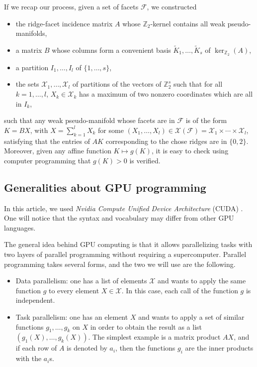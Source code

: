 \documentclass[11pt]{amsart}
\theoremstyle{plain}
\numberwithin{equation}{section}
\theoremstyle{definition}
\newcommand{\cF}{\mathcal{F}}
\newcommand{\cX}{\mathcal{X}}
\newcommand{\Z}{\mathbb{Z}}
\begin{document}
If we recap our process, given a set of facets $\cF$, we constructed
\begin{itemize}
	\item the ridge-facet incidence matrix $A$ whose $\Z_2$-kernel contains all weak pseudo-manifolds,
	\item a matrix $B$ whose columns form a convenient basis $\widetilde{K}_1,\ldots,\widetilde{K}_s$ of $\ker_{\Z_2}(A)$,
	\item a partition $I_1,\ldots,I_l$ of $\{1,\ldots,s\}$,
	\item the sets $\cX_1,\ldots,\cX_l$ of partitions of the vectors of $\Z_2^s$ such that for all $k=1,\ldots,l$, $X_k\in\cX_k$ has a maximum of two nonzero coordinates which are all in $I_k$,
\end{itemize}
such that any weak pseudo-manifold whose facets are in $\cF$ is of the form $K = BX$, with $X=\sum_{k=1}^l X_k$ for some $(X_1,\ldots,X_l)\in \cX(\cF) =\cX_1\times\cdots\times \cX_l$, satisfying that the entries of $AK$ corresponding to the chose ridges are in $\{0,2\}$.
Moreover, given any affine function $K\mapsto g(K)$, it is easy to check using computer programming that $g(K)>0$ is verified.


\subsection{Generalities about GPU programming}\label{subsection:cuda}
In this article, we used \emph{Nvidia Compute Unified Device Architecture} (CUDA) \cite{cuda}.
One will notice that the syntax and vocabulary may differ from other GPU languages.

The general idea behind GPU computing is that it allows parallelizing tasks with two layers of parallel programming without requiring a supercomputer.
Parallel programming takes several forms, and the two we will use are the following.
\begin{itemize}
	\item Data parallelism: one has a list of elements $\cX$ and wants to apply the same function $g$ to every element $X\in\cX$. In this case, each call of the function $g$ is independent.
	\item Task parallelism: one has an element $X$ and wants to apply a set of similar functions $g_1,\ldots,g_k$ on $X$ in order to obtain the result as a list $(g_1(X),\ldots,g_k(X))$.
	The simplest example is a matrix product $AX$, and if each row of $A$ is denoted by $a_i$, then the functions $g_i$ are the inner products with the $a_i$s.
\end{itemize}
\end{document}
